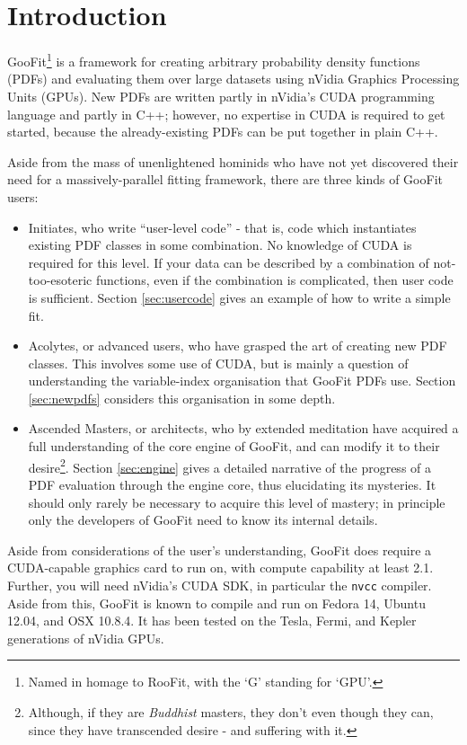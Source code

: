 \documentclass[12pt,pdflatex]{article}
\begin{document}
\tableofcontents

\newpage 

\section{Introduction}

GooFit\footnote{Named in homage to RooFit, with the `G' standing for `GPU'.}
is a framework for creating arbitrary probability density functions (PDFs) 
and evaluating them over large datasets using nVidia Graphics Processing Units (GPUs). 
New PDFs are written partly in nVidia's CUDA programming language and
partly in C++; however, no expertise in CUDA is required to get started, 
because the already-existing PDFs can be put together in plain C++. 

Aside from the mass of unenlightened hominids who have not yet discovered
their need for a massively-parallel fitting framework, there are three kinds
of GooFit users:
\begin{itemize}
\item Initiates, who write ``user-level code'' - that is, code which 
instantiates existing PDF classes in some combination. No knowledge of
CUDA is required for this level.
If your data can be described
by a combination of not-too-esoteric functions, even if the combination is 
complicated, then user code is sufficient. Section \ref{sec:usercode}
gives an example of how to write a simple fit.
\item Acolytes, or advanced users, who have grasped the art of creating new PDF classes.
This involves some use of CUDA, but is mainly a question of understanding
the variable-index organisation that GooFit PDFs use. Section \ref{sec:newpdfs}
considers this organisation in some depth.
\item Ascended Masters, or architects, who by extended meditation have 
acquired a full understanding of the core engine of GooFit, and can modify it
to their desire\footnote{Although, if they are \emph{Buddhist} masters,
they don't even though they can, since they have transcended desire - and suffering 
with it.}. Section \ref{sec:engine} gives a detailed narrative of the
progress of a PDF evaluation through the engine core, thus elucidating its
mysteries. It should only rarely be necessary to acquire this level of 
mastery; in principle only the developers of GooFit need to know its 
internal details. 
\end{itemize}

Aside from considerations of the user's understanding, GooFit does require
a CUDA-capable graphics card to run on, with compute capability at least 2.1.
Further, you will need nVidia's CUDA SDK, in particular the \texttt{nvcc} compiler.
Aside from this, GooFit is known to compile and run on Fedora 14, Ubuntu 12.04,
and OSX 10.8.4. It has been tested on the Tesla, Fermi, and Kepler
generations of nVidia GPUs. 
\end{document}
